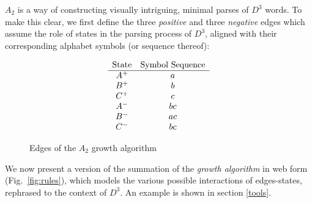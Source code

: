\documentclass[nonatbib,numbers,10pt]{sigplanconf}
\begin{document}
$A_2$ is a way of constructing visually intriguing, minimal parses of $D^3$ words. To make this clear, we first define the three \textit{positive} and three \textit{negative} edges which assume the role of states in the parsing process of $D^3$, aligned with their corresponding alphabet symbols (or sequence thereof):
\begin{figure}[h!]
\[\begin{array}{c c}
$State$ & $Symbol Sequence$\\
\hline
A^+ & a\\
B^+ & b\\
C^+ & c\\
A^- & bc\\
B^- & ac\\
C^- & bc\\
\end{array}\]
\caption{Edges of the $A_2$ growth algorithm}
\label{fig:states}
\end{figure}

We now present a version of the summation of the \textit{growth algorithm} \cite{petersen} in web form (Fig.~\ref{fig:rules}), which models the various possible interactions of edges-states, rephrased to the context of $D^3$. An example is shown in section \ref{tools}.
\end{document}

